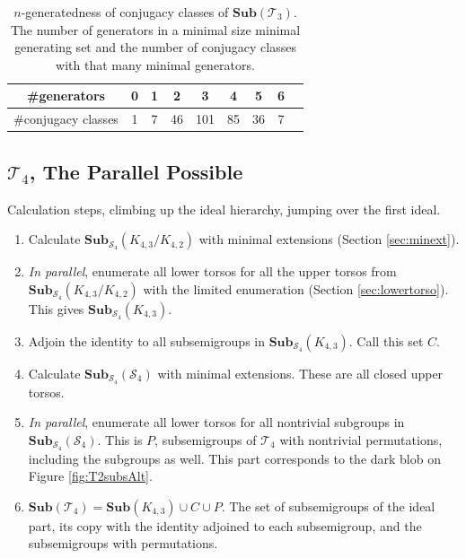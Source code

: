 \documentclass{amsart}
\newcommand{\cT}{{\mathcal T}}
\newcommand{\cS}{{\mathcal S}}
\newcommand{\Sub}{\mathbf{Sub}}
\theoremstyle{plain}
\theoremstyle{definition}
\begin{document}
\begin{table}
\small
\renewcommand{\tabcolsep}{1pt}
\renewcommand{\arraystretch}{1}
\begin{tabular}{|c|c|c|c|c|c|c|c|c|}
\hline
\#generators&0&1&2&3& 4 & 5 & 6 \\
\hline
\#conjugacy classes &1&  7& 46& 101& 85& 36& 7 \\
\hline
\end{tabular}
\normalsize
\caption{$n$-generatedness of conjugacy classes of $\Sub(\cT_3)$. The number of generators in a minimal size minimal generating set and the number of conjugacy classes with that many minimal generators.}
\label{tab:T3ngeneratedness}
\end{table}

\subsection{$\cT_4$, The Parallel Possible }

Calculation steps, climbing up the ideal hierarchy, jumping over the first ideal.

\begin{enumerate}
\item Calculate $\Sub_{\cS_4}(K_{4,3}/K_{4,2})$ with minimal extensions (Section \ref{sec:minext}). 
\item \emph{In parallel}, enumerate all lower torsos for all the upper torsos from $\Sub_{\cS_4}(K_{4,3}/K_{4,2})$ with the limited enumeration (Section \ref{sec:lowertorso}). This gives $\Sub_{\cS_4}(K_{4,3})$.
\item Adjoin the identity to all subsemigroups in $\Sub_{\cS_4}(K_{4,3})$. Call this set $C$.
\item Calculate $\Sub_{\cS_4}(\cS_4)$ with minimal extensions. These are all closed upper torsos.
\item \emph{In parallel}, enumerate all lower torsos for all nontrivial subgroups in $\Sub_{\cS_4}(\cS_4)$. This is $P$, subsemigroups of $\cT_4$ with nontrivial permutations, including the subgroups as well. This part corresponds to the dark blob on Figure \ref{fig:T2subsAlt}.
\item $\Sub(\cT_4)=\Sub(K_{4,3})\cup C \cup P$. The set of subsemigroups of the ideal part, its copy with the identity adjoined to each subsemigroup, and the subsemigroups with permutations.
\end{enumerate}
\end{document}
